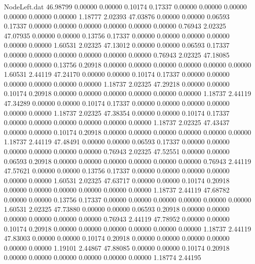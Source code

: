 \begin{filecontents}{NodeLeft.dat}
  46.98799    0.00000    0.00000     0.10174    0.17337    0.00000    0.00000    0.00000    0.00000    0.00000    0.00000    1.18777    2.02393
  47.03876    0.00000    0.00000     0.06593    0.17337    0.00000    0.00000    0.00000    0.00000    0.00000    0.00000    0.76943    2.02325
  47.07935    0.00000    0.00000     0.13756    0.17337    0.00000    0.00000    0.00000    0.00000    0.00000    0.00000    1.60531    2.02325
  47.13012    0.00000    0.00000     0.06593    0.17337    0.00000    0.00000    0.00000    0.00000    0.00000    0.00000    0.76943    2.02325
  47.18085    0.00000    0.00000     0.13756    0.20918    0.00000    0.00000    0.00000    0.00000    0.00000    0.00000    1.60531    2.44119
  47.24170    0.00000    0.00000     0.10174    0.17337    0.00000    0.00000    0.00000    0.00000    0.00000    0.00000    1.18737    2.02325
  47.29218    0.00000    0.00000     0.10174    0.20918    0.00000    0.00000    0.00000    0.00000    0.00000    0.00000    1.18737    2.44119
  47.34289    0.00000    0.00000     0.10174    0.17337    0.00000    0.00000    0.00000    0.00000    0.00000    0.00000    1.18737    2.02325
  47.38354    0.00000    0.00000     0.10174    0.17337    0.00000    0.00000    0.00000    0.00000    0.00000    0.00000    1.18737    2.02325
  47.43437    0.00000    0.00000     0.10174    0.20918    0.00000    0.00000    0.00000    0.00000    0.00000    0.00000    1.18737    2.44119
  47.48491    0.00000    0.00000     0.06593    0.17337    0.00000    0.00000    0.00000    0.00000    0.00000    0.00000    0.76943    2.02325
  47.52551    0.00000    0.00000     0.06593    0.20918    0.00000    0.00000    0.00000    0.00000    0.00000    0.00000    0.76943    2.44119
  47.57621    0.00000    0.00000     0.13756    0.17337    0.00000    0.00000    0.00000    0.00000    0.00000    0.00000    1.60531    2.02325
  47.63717    0.00000    0.00000     0.10174    0.20918    0.00000    0.00000    0.00000    0.00000    0.00000    0.00000    1.18737    2.44119
  47.68782    0.00000    0.00000     0.13756    0.17337    0.00000    0.00000    0.00000    0.00000    0.00000    0.00000    1.60531    2.02325
  47.73880    0.00000    0.00000     0.06593    0.20918    0.00000    0.00000    0.00000    0.00000    0.00000    0.00000    0.76943    2.44119
  47.78952    0.00000    0.00000     0.10174    0.20918    0.00000    0.00000    0.00000    0.00000    0.00000    0.00000    1.18737    2.44119
  47.83003    0.00000    0.00000     0.10174    0.20918    0.00000    0.00000    0.00000    0.00000    0.00000    0.00000    1.19101    2.44867
  47.88085    0.00000    0.00000     0.10174    0.20918    0.00000    0.00000    0.00000    0.00000    0.00000    0.00000    1.18774    2.44195

\end{filecontents}
